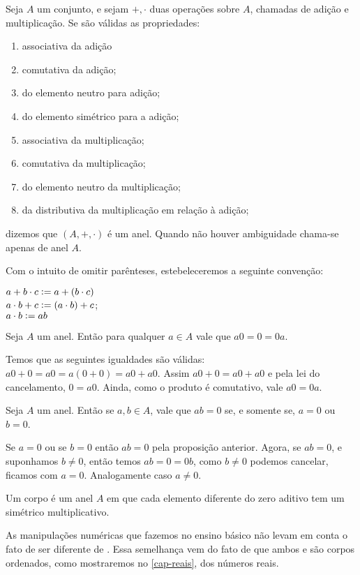 \documentclass[../main.tex]{subfiles}
\begin{document}
\begin{defi}\label{agb-def-anel}
    Seja $A$ um conjunto, e sejam $+, \cdot$ duas operações sobre $A$, chamadas de adição e multiplicação. Se são válidas as propriedades:
    \begin{enumerate}[label=(\roman*)]
        \item associativa da adição
        \item comutativa da adição;
        \item do elemento neutro para adição;
        \item do elemento simétrico para a adição;
        \item associativa da multiplicação;
        \item comutativa da multiplicação;
        \item do elemento neutro da multiplicação;
        \item da distributiva da multiplicação em relação à adição;
    \end{enumerate}
    dizemos que $(A, +, \cdot)$ é um anel. Quando não houver ambiguidade chama-se apenas de anel $A$.
\end{defi}
\begin{obs}
	Com o intuito de omitir parênteses, estebeleceremos a seguinte convenção: 
	\begin{center}
    	$a + b \cdot c \vcentcolon= a + (b \cdot c)$  \\
    	$a \cdot b + c \vcentcolon= (a \cdot b) + c$; \\
    	$a \cdot b \vcentcolon= ab$	    
	\end{center}
\end{obs}

{ \textoIncluido
\begin{prop}
    Seja $A$ um anel. Então para qualquer $a \in A$ vale que $a0 = 0 = 0a$.
\end{prop}
\begin{dem}
 Temos que as seguintes igualdades são válidas: $a0+0 = a0 = a(0+0) = a0+a0$. Assim $a0+0 = a0+a0$ e pela lei do cancelamento, $0=a0$. Ainda, como o produto é comutativo, vale $a0=0a$.
\end{dem}

\begin{prop}
    Seja $A$ um anel. Então se $a,b \in A$, vale que $ab = 0$ se, e somente se, $a = 0$ ou $b = 0$.
\end{prop}
\begin{dem}
    Se $a = 0$ ou se $b=0$ então $ab = 0$ pela proposição anterior.
    Agora, se $ab=0$, e suponhamos $b \neq 0$, então temos $ab = 0 = 0b$, como $b \neq 0$ podemos cancelar, ficamos com $a=0$. Analogamente caso $a \neq 0$.
\end{dem}
}


\begin{defi}
    Um corpo é um anel $A$ em que cada elemento diferente do zero aditivo tem um simétrico multiplicativo.
\end{defi}
As manipulações numéricas que fazemos no ensino básico não levam em conta o fato de \Q ser diferente de \R. Essa semelhança vem do fato de que ambos \Q e \R são corpos ordenados, como mostraremos no \cref{cap-reais}, dos números reais. 
\end{document}
